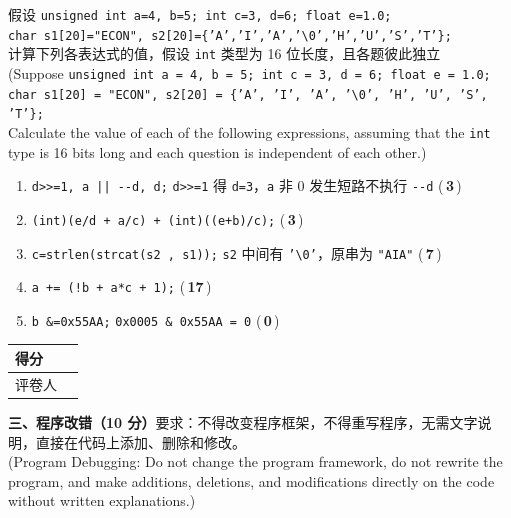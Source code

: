 \documentclass[a4paper,11pt]{ctexart}
\newcommand{\ansmark}[1]{\hfill(\,\textcolor{ansred}{\textbf{#1}}\,)}
\newcommand{\secbox}[2]{%
  \noindent\begin{tabular}{|>{\centering\arraybackslash}m{1.5cm}|>{\centering\arraybackslash}m{1.5cm}|}
    \hline
    得\quad 分 & \\ \hline
    评卷人 & \\ \hline
  \end{tabular}\hspace{0.8em}%
  \begin{minipage}[c]{\dimexpr\textwidth-4.2cm\relax}
    \textbf{#1}#2
  \end{minipage}\par\vspace{0.5em}%
}
\begin{document}
\noindent 假设 \texttt{unsigned int a=4, b=5; int c=3, d=6; float e=1.0;}\\
\phantom{假设 }\texttt{char s1[20]="ECON", s2[20]=\{'A','I','A','\textbackslash 0','H','U','S','T'\};}\\
计算下列各表达式的值，假设 \texttt{int} 类型为 16 位长度，且各题彼此独立\\
{\small (Suppose \texttt{unsigned int a = 4, b = 5; int c = 3, d = 6; float e = 1.0;}\\
\phantom{(Suppose }\texttt{char s1[20] = "ECON", s2[20] = \{'A', 'I', 'A', '\textbackslash 0', 'H', 'U', 'S', 'T'\};}\\
Calculate the value of each of the following expressions, assuming that the \texttt{int} type is 16 bits long and each question is independent of each other.)}

\begin{enumerate}[label=(\arabic*), leftmargin=2.4em, itemsep=4pt]
  \item \texttt{d>>=1, a || -{}-d, d;} \hfill \textcolor{noteblue}{\small \texttt{d>>=1} 得 \texttt{d=3}，\texttt{a} 非 0 发生短路不执行 \texttt{-{}-d}} \quad (\,\textcolor{ansred}{\textbf{3}}\,)
  \item \texttt{(int)(e/d + a/c) + (int)((e+b)/c);} \ansmark{3}
  \item \texttt{c=strlen(strcat(s2 , s1));} \hfill \textcolor{noteblue}{\small \texttt{s2} 中间有 \texttt{'\textbackslash 0'}，原串为 \texttt{"AIA"}} \quad (\,\textcolor{ansred}{\textbf{7}}\,)
  \item \texttt{a += (!b + a*c + 1);} \ansmark{17}
  \item \texttt{b \&=0x55AA;} \hfill \textcolor{noteblue}{\small \texttt{0x0005 \& 0x55AA = 0}} \quad (\,\textcolor{ansred}{\textbf{0}}\,)
\end{enumerate}

\vspace{8pt}

\secbox{三、程序改错（10 分）}{要求：不得改变程序框架，不得重写程序，无需文字说明，直接在代码上添加、删除和修改。\\{\small (Program Debugging: Do not change the program framework, do not rewrite the program, and make additions, deletions, and modifications directly on the code without written explanations.)}}
\end{document}
